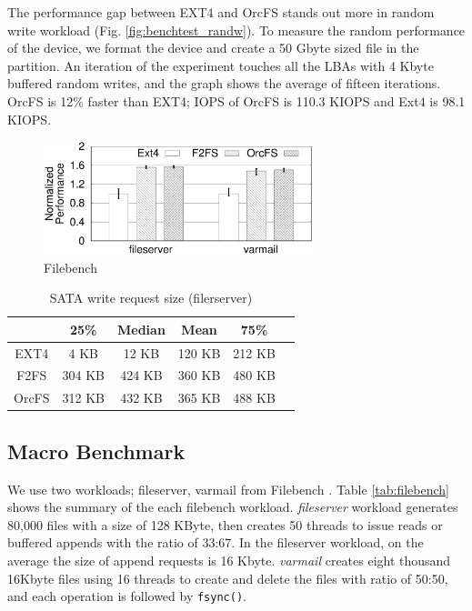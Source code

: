 \documentclass[pageno]{jpaper}
\begin{document}
The performance gap between EXT4 and OrcFS stands out more in random
write workload (Fig. \ref{fig:benchtest_randw}).  To measure the
random performance of the device, we format the device and create a 50
Gbyte sized file in the partition. An iteration of the experiment
touches all the LBAs with 4 Kbyte buffered random writes, and the
graph shows the average of fifteen iterations. OrcFS is 12$\%$ faster
than EXT4; IOPS of OrcFS is 110.3 KIOPS and Ext4 is 98.1 KIOPS.


\begin{figure}[t]
  \begin{center}
  \includegraphics[height=1.3in]{./bench/filebench.eps}
  \caption{Filebench}
  \label{fig:filebench}
  \end{center}
\end{figure}

\begin{table}[t]
\begin{center}
\begin{tabular}{|c|c|c|c|c|c|} \hline
  		& 25\%	& Median	& Mean	& 75\%   \\ \hline\hline
  EXT4	& 4 KB	& 12 KB	& 120 KB	& 212 KB \\ \hline
  F2FS 	& 304 KB	& 424 KB	& 360 KB	& 480 KB	\\ \hline
  OrcFS 	& 312 KB	& 432 KB	& 365 KB	& 488 KB 	\\ \hline
\end{tabular}
\end{center}
\caption{SATA write request size (filerserver)}
\label{tab:fileserver_size}
\end{table}

\subsection{Macro Benchmark}
\label{subsec:micro_bench}

We use two workloads; fileserver, varmail from Filebench
\cite{filebench}.  Table \ref{tab:filebench} shows the summary of the
each filebench workload.  \emph{fileserver} workload generates 80,000
files with a size of 128 KByte, then creates 50 threads to issue reads
or buffered appends with the ratio of 33:67. In the fileserver
workload, on the average the size of append requests is 16 Kbyte.
\emph{varmail} creates eight thousand 16Kbyte files using 16 threads
to create and delete the files with ratio of 50:50, and each operation
is followed by \texttt{fsync()}.
\end{document}

